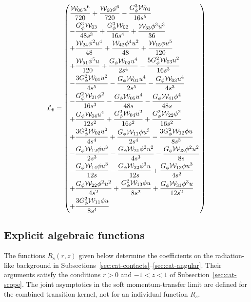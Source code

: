 \documentclass[11pt,a4paper]{article}
\begin{document}
\begin{equation}
\mathcal L_{6}=\left(\vcenter{\hbox{\shortstack[l]{$\displaystyle \frac{\mathcal W_{06} u^{6}}{720} + \frac{\mathcal W_{60} \phi^{6}}{720} - \frac{G_{\phi}^{3} \mathcal W_{01}}{16 s^{5}}$\\
$\displaystyle - \frac{G_{\phi}^{3} \mathcal W_{03}}{48 s^{3}} + \frac{G_{\phi}^{3} \mathcal W_{02}}{16 s^{4}} + \frac{\mathcal W_{33} \phi^{3} u^{3}}{36}$\\
$\displaystyle + \frac{\mathcal W_{24} \phi^{2} u^{4}}{48} + \frac{\mathcal W_{42} \phi^{4} u^{2}}{48} + \frac{\mathcal W_{15} \phi u^{5}}{120}$\\
$\displaystyle + \frac{\mathcal W_{51} \phi^{5} u}{120} + \frac{G_{\phi} \mathcal W_{02} u^{4}}{2 s^{4}} - \frac{5 G_{\phi}^{2} \mathcal W_{03} u^{2}}{16 s^{3}}$\\
$\displaystyle - \frac{3 G_{\phi}^{2} \mathcal W_{01} u^{2}}{4 s^{5}} - \frac{G_{\phi} \mathcal W_{01} u^{4}}{2 s^{5}} - \frac{G_{\phi} \mathcal W_{03} u^{4}}{4 s^{3}}$\\
$\displaystyle - \frac{G_{\phi}^{2} \mathcal W_{21} \phi^{2}}{16 s^{3}} - \frac{G_{\phi} \mathcal W_{05} u^{4}}{48 s} - \frac{G_{\phi} \mathcal W_{41} \phi^{4}}{48 s}$\\
$\displaystyle + \frac{G_{\phi} \mathcal W_{04} u^{4}}{12 s^{2}} + \frac{G_{\phi}^{2} \mathcal W_{04} u^{2}}{16 s^{2}} + \frac{G_{\phi}^{2} \mathcal W_{22} \phi^{2}}{16 s^{2}}$\\
$\displaystyle + \frac{3 G_{\phi}^{2} \mathcal W_{02} u^{2}}{4 s^{4}} + \frac{G_{\phi} \mathcal W_{11} \phi u^{3}}{2 s^{4}} - \frac{3 G_{\phi}^{2} \mathcal W_{12} \phi u}{8 s^{3}}$\\
$\displaystyle - \frac{G_{\phi} \mathcal W_{12} \phi u^{3}}{2 s^{3}} - \frac{G_{\phi} \mathcal W_{21} \phi^{2} u^{2}}{4 s^{3}} - \frac{G_{\phi} \mathcal W_{23} \phi^{2} u^{2}}{8 s}$\\
$\displaystyle - \frac{G_{\phi} \mathcal W_{14} \phi u^{3}}{12 s} - \frac{G_{\phi} \mathcal W_{32} \phi^{3} u}{12 s} + \frac{G_{\phi} \mathcal W_{13} \phi u^{3}}{4 s^{2}}$\\
$\displaystyle + \frac{G_{\phi} \mathcal W_{22} \phi^{2} u^{2}}{4 s^{2}} + \frac{G_{\phi}^{2} \mathcal W_{13} \phi u}{8 s^{2}} + \frac{G_{\phi} \mathcal W_{31} \phi^{3} u}{12 s^{2}}$\\
$\displaystyle + \frac{3 G_{\phi}^{2} \mathcal W_{11} \phi u}{8 s^{4}}$}}}\right)
\label{eq:cat-local-L-6}
\end{equation}
\subsection{Explicit algebraic functions}
\label{sec:cat-rationals}
The functions $ R_s(r,z) $ given below determine the coefficients on the radiation-like background in Subsections~\ref{sec:cat-contacts}--\ref{sec:cat-angular}. Their arguments satisfy the conditions $ r>0 $ and $ -1<z<1 $ of Subsection~\ref{sec:cat-scope}. The joint asymptotics in the soft momentum-transfer limit are defined for the combined transition kernel, not for an individual function $ R_s $.
\end{document}
